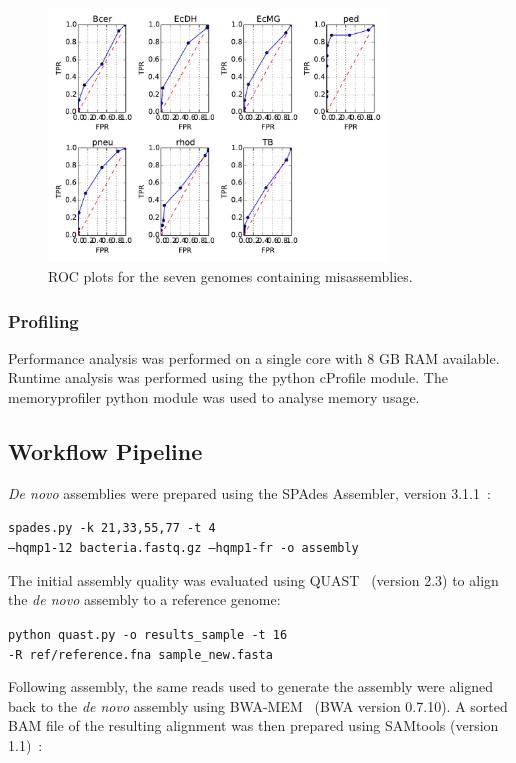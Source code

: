 \documentclass[fleqn,10pt]{wlpeerj}
\begin{document}
\begin{figure}
\centerline{\includegraphics[width=0.8\textwidth]{allROC.pdf}}
\caption{ROC plots for the seven genomes containing misassemblies.\label{fig:ROCs}}
\end{figure}

\subsubsection*{Profiling}
Performance analysis was performed on a single core with 8 GB RAM available. Runtime analysis was performed using the python cProfile module. The memoryprofiler python module was used to analyse memory usage.

\subsection*{Workflow Pipeline}
\textit{De novo} assemblies were prepared using the SPAdes Assembler, version 3.1.1~\citep{Bankevich2012}:

\texttt{spades.py -k 21,33,55,77 -t 4 \\ --hqmp1-12 bacteria.fastq.gz  --hqmp1-fr -o assembly}

The initial assembly quality was evaluated using QUAST~\citep{gurevich2013} (version 2.3) to align the \textit{de novo} assembly to a reference genome:

\texttt{python quast.py -o results\_sample -t 16 \\  -R ref/reference.fna sample\_new.fasta }

  Following assembly, the same reads used to generate the assembly were aligned back to the \textit{de novo} assembly using BWA-MEM~\citep{li2013} (BWA version 0.7.10). A sorted BAM file of the resulting alignment was then prepared using SAMtools (version 1.1)~\citep{li2009}: 
\end{document}
